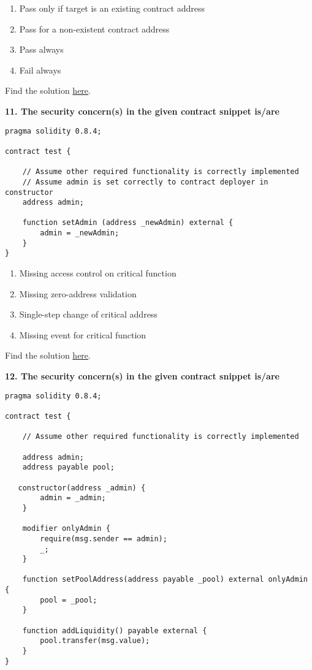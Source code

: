 \begin{enumerate}[label=\Alph*.]
    \item Pass only if target is an existing contract address
    \item Pass for a non-existent contract address
    \item Pass always
    \item Fail always
\end{enumerate}

Find the solution \hyperref[sec:exam4_q10]{here}.\\

\pagebreak

\textbf{11. The security concern(s) in the given contract snippet is/are}

\begin{lstlisting}[language=Solidity, style=solStyle]
pragma solidity 0.8.4;

contract test {

    // Assume other required functionality is correctly implemented
    // Assume admin is set correctly to contract deployer in constructor
    address admin;

    function setAdmin (address _newAdmin) external {
        admin = _newAdmin;
    }
}
\end{lstlisting}

\begin{enumerate}[label=\Alph*.]
    \item Missing access control on critical function
    \item Missing zero-address validation
    \item Single-step change of critical address
    \item Missing event for critical function
\end{enumerate}

Find the solution \hyperref[sec:exam4_q11]{here}.\\

\pagebreak

\textbf{12. The security concern(s) in the given contract snippet is/are}

\begin{lstlisting}[language=Solidity, style=solStyle]
pragma solidity 0.8.4;

contract test {

    // Assume other required functionality is correctly implemented

    address admin;
    address payable pool;

   constructor(address _admin) {
        admin = _admin;
    }

    modifier onlyAdmin {
        require(msg.sender == admin);
        _;
    }

    function setPoolAddress(address payable _pool) external onlyAdmin {
        pool = _pool;
    }

    function addLiquidity() payable external {
        pool.transfer(msg.value);
    }
}
\end{lstlisting}

